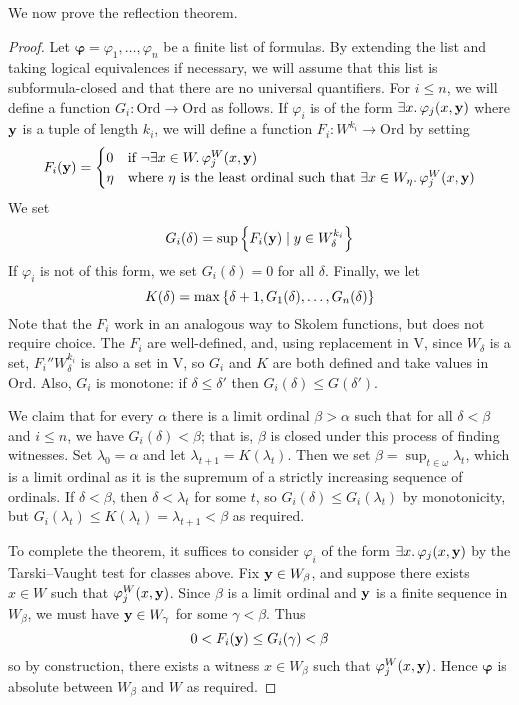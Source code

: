 We now prove the reflection theorem.
\begin{proof}
    Let \( \bm\varphi = \varphi_1, \dots, \varphi_n \) be a finite list of formulas.
    By extending the list and taking logical equivalences if necessary, we will assume that this list is subformula-closed and that there are no universal quantifiers.
    For \( i \leq n \), we will define a function \( G_i : \mathrm{Ord} \to \mathrm{Ord} \) as follows.
    If \( \varphi_i \) is of the form \( \exists x.\, \varphi_j(x, \vb y) \) where \( \vb y \) is a tuple of length \( k_i \), we will define a function \( F_i : W^{k_i} \to \mathrm{Ord} \) by setting
    \[ F_i(\vb y) = \begin{cases}
        0 & \text{if } \neg\exists x \in W.\, \varphi_j^W(x, \vb y) \\
        \eta & \text{where } \eta \text{ is the least ordinal such that } \exists x \in W_\eta.\, \varphi_j^W(x, \vb y)
    \end{cases} \]
    We set
    \[ G_i(\delta) = \sup\qty{F_i(\vb y) \mid y \in W_\delta^{k_i}} \]
    If \( \varphi_i \) is not of this form, we set \( G_i(\delta) = 0 \) for all \( \delta \).
    Finally, we let
    \[ K(\delta) = \max\qty{\delta + 1, G_1(\delta), \dots, G_n(\delta)} \]
    Note that the \( F_i \) work in an analogous way to Skolem functions, but does not require choice.
    The \( F_i \) are well-defined, and, using replacement in \( \mathrm{V} \), since \( W_\delta \) is a set, \( F_i '' W_\delta^{k_i} \) is also a set in \( \mathrm{V} \), so \( G_i \) and \( K \) are both defined and take values in \( \mathrm{Ord} \).
    Also, \( G_i \) is monotone: if \( \delta \leq \delta' \) then \( G_i(\delta) \leq G(\delta') \).

    We claim that for every \( \alpha \) there is a limit ordinal \( \beta > \alpha \) such that for all \( \delta < \beta \) and \( i \leq n \), we have \( G_i(\delta) < \beta \); that is, \( \beta \) is closed under this process of finding witnesses.
    Set \( \lambda_0 = \alpha \) and let \( \lambda_{t+1} = K(\lambda_t) \).
    Then we set \( \beta = \sup_{t \in \omega} \lambda_t \), which is a limit ordinal as it is the supremum of a strictly increasing sequence of ordinals.
    If \( \delta < \beta \), then \( \delta < \lambda_t \) for some \( t \), so \( G_i(\delta) \leq G_i(\lambda_t) \) by monotonicity, but \( G_i(\lambda_t) \leq K(\lambda_t) = \lambda_{t+1} < \beta \) as required.

    To complete the theorem, it suffices to consider \( \varphi_i \) of the form \( \exists x.\, \varphi_j(x, \vb y) \) by the Tarski--Vaught test for classes above.
    Fix \( \vb y \in W_\beta \), and suppose there exists \( x \in W \) such that \( \varphi_j^W(x, \vb y) \).
    Since \( \beta \) is a limit ordinal and \( \vb y \) is a finite sequence in \( W_\beta \), we must have \( \vb y \in W_\gamma \) for some \( \gamma < \beta \).
    Thus
    \[ 0 < F_i(\vb y) \leq G_i(\gamma) < \beta \]
    so by construction, there exists a witness \( x \in W_\beta \) such that \( \varphi_j^W(x, \vb y) \).
    Hence \( \bm\varphi \) is absolute between \( W_\beta \) and \( W \) as required.
\end{proof}
